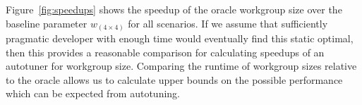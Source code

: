 \documentclass[nonatbib,preprint,10pt]{sigplanconf}
\begin{document}
Figure~\ref{fig:speedups} shows the speedup of the oracle workgroup
size over the baseline parameter $w_{(4 \times 4)}$ for all
scenarios. If we assume that sufficiently pragmatic developer with
enough time would eventually find this static optimal, then this
provides a reasonable comparison for calculating speedups of an
autotuner for workgroup size. Comparing the runtime of workgroup sizes
relative to the oracle allows us to calculate upper bounds on the
possible performance which can be expected from autotuning.


\end{document}
